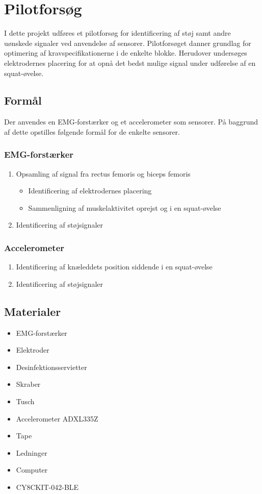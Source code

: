 \section{Pilotforsøg}
I dette projekt udføres et pilotforsøg for identificering af støj samt andre uønskede signaler ved anvendelse af sensorer. Pilotforsøget danner grundlag for optimering af kravspecifikationerne i de enkelte blokke. Herudover undersøges elektrodernes placering for at opnå det bedst mulige signal under udførelse af en squat-øvelse.


\subsection{Formål}
Der anvendes en EMG-forstærker og et accelerometer som sensorer. På baggrund af dette opstilles følgende formål for de enkelte sensorer.  

\subsubsection{EMG-forstærker}
\begin{enumerate}
\item Opsamling af signal fra rectus femoris og biceps femoris
\begin{itemize}
\item Identificering af elektrodernes placering
\item Sammenligning af muskelaktivitet oprejst og i en squat-øvelse 
\end{itemize}
\item Identificering af støjsignaler
\end{enumerate}


\subsubsection{Accelerometer}
\begin{enumerate}
\item Identificering af knæleddets position siddende i en squat-øvelse
\item Identificering af støjsignaler
\end{enumerate}


\subsection{Materialer} 
\begin{itemize}
\item EMG-forstærker
\item Elektroder
\item Desinfektionsservietter
\item Skraber
\item Tusch 

\item Accelerometer ADXL335Z
\item Tape
\item Ledninger

\item Computer
\item CY8CKIT-042-BLE
\end{itemize}


